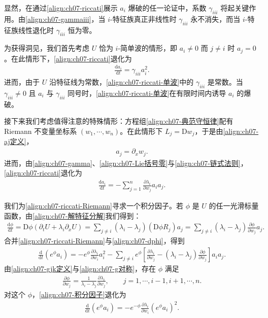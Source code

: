 \documentclass[../../main.tex]{subfiles}
\begin{document}
显然，在通过\eqref{align:ch07-riccati}展示 $a_i$ 爆破的任一论证中，系数 $\gamma_{iii}$ 将起关键作用。由\eqref{align:ch07-gammaiii}，当 $i$-特征族真正非线性时 $\gamma_{iii}$ 永不消失，而当 $i$-特征族线性退化时 $\gamma_{iii}$ 恒为零。

为获得洞见，我们首先考虑 $U$ 恰为 $i$-简单波的情形，即 $a_i\neq 0$ 而 $j\neq i$ 时 $a_j=0$。在此情形下，\eqref{align:ch07-riccati}退化为
\begin{align}
\frac{\mathrm{d}a_i}{\mathrm{d}t}=\gamma_{iii}a_i^2.
\label{align:ch07-riccati-单波}
\end{align}
进而，由于 $U$ 沿特征线为常数，\eqref{align:ch07-riccati-单波}中的 $\gamma_{iii}$ 是常数。当 $\gamma_{iii}\neq 0$ 且 $a_i$ 与 $\gamma_{iii}$ 同号时，\eqref{align:ch07-riccati-单波}在有限时间内诱导 $a_i$ 的爆破。

接下来我们考虑值得注意的特殊情形：方程组\eqref{align:ch07-典范守恒律}配有 Riemann 不变量坐标系 $(w_1,\cdots,w_n)$。在此情形下 $L_j=\mathrm{D}w_j$，于是由\eqref{align:ch07-aj定义}，
\begin{align}
a_j=\partial_x w_j.
\label{align:ch07-ajRiemann}
\end{align}
进而，由\eqref{align:ch07-gamma}、\eqref{align:ch07-Lie括号零}与\eqref{align:ch07-链式法则}，\eqref{align:ch07-riccati}退化为
\begin{align}
\frac{\mathrm{d}a_i}{\mathrm{d}t}=-\sum_{j=1}^n\frac{\partial\lambda_i}{\partial w_j}a_i a_j.
\label{align:ch07-riccati-Riemann}
\end{align}

我们为\eqref{align:ch07-riccati-Riemann}寻求一个积分因子。若 $\phi$ 是 $U$ 的任一光滑标量函数，由\eqref{align:ch07-解特征分解}我们得到：
\begin{align}
\frac{\mathrm{d}\phi}{\mathrm{d}t}=\mathrm{D}\phi(\partial_t U+\lambda_i\partial_x U)=\sum_{j\neq i}(\lambda_i-\lambda_j)(\mathrm{D}\phi R_j)a_j=\sum_{j\neq i}(\lambda_i-\lambda_j)\frac{\partial\phi}{\partial w_j}a_j.
\label{align:ch07-dphi}
\end{align}
合并\eqref{align:ch07-riccati-Riemann}与\eqref{align:ch07-dphi}，得到
\begin{align}
\frac{\mathrm{d}}{\mathrm{d}t}(e^\phi a_i)=-e^\phi\frac{\partial\lambda_i}{\partial w_i}a_i^2-\sum_{j\neq i}e^\phi\left[\frac{\partial\lambda_i}{\partial w_j}-(\lambda_i-\lambda_j)\frac{\partial\phi}{\partial w_j}\right]a_i a_j.
\label{align:ch07-积分因子}
\end{align}
由\eqref{align:ch07-gjk定义}与\eqref{align:ch07-g对称}，存在 $\phi$ 满足
\begin{align}
\frac{\partial\phi}{\partial w_j}=\frac{1}{\lambda_i-\lambda_j}\frac{\partial\lambda_i}{\partial w_j},\qquad j=1,\cdots,i-1,i+1,\cdots,n.
\label{align:ch07-phi方程}
\end{align}
对这个 $\phi$，\eqref{align:ch07-积分因子}退化为
\begin{align}
\frac{\mathrm{d}}{\mathrm{d}t}(e^\phi a_i)=-e^{-\phi}\frac{\partial\lambda_i}{\partial w_i}(e^\phi a_i)^2.
\label{align:ch07-最终Riccati}
\end{align}
\end{document}

